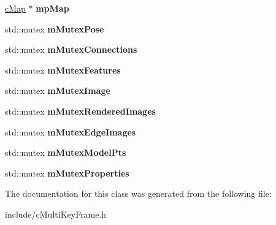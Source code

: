 \begin{DoxyCompactItemize}
\item 
\hyperlink{classMultiColSLAM_1_1cMap}{c\+Map} $\ast$ {\bfseries mp\+Map}\hypertarget{classMultiColSLAM_1_1cMultiKeyFrame_a2f9eeb3c126b9d3414ebaa3fe2f2aaf6}{}\label{classMultiColSLAM_1_1cMultiKeyFrame_a2f9eeb3c126b9d3414ebaa3fe2f2aaf6}

\item 
std\+::mutex {\bfseries m\+Mutex\+Pose}\hypertarget{classMultiColSLAM_1_1cMultiKeyFrame_ab1a3d1018970918898ae1723ce8df974}{}\label{classMultiColSLAM_1_1cMultiKeyFrame_ab1a3d1018970918898ae1723ce8df974}

\item 
std\+::mutex {\bfseries m\+Mutex\+Connections}\hypertarget{classMultiColSLAM_1_1cMultiKeyFrame_a738f6d55547b533c3b55d03998306347}{}\label{classMultiColSLAM_1_1cMultiKeyFrame_a738f6d55547b533c3b55d03998306347}

\item 
std\+::mutex {\bfseries m\+Mutex\+Features}\hypertarget{classMultiColSLAM_1_1cMultiKeyFrame_a5c53a53ee7c2ba8ed7365072de496556}{}\label{classMultiColSLAM_1_1cMultiKeyFrame_a5c53a53ee7c2ba8ed7365072de496556}

\item 
std\+::mutex {\bfseries m\+Mutex\+Image}\hypertarget{classMultiColSLAM_1_1cMultiKeyFrame_aafc2dcb33cbe43e26c021580162a85be}{}\label{classMultiColSLAM_1_1cMultiKeyFrame_aafc2dcb33cbe43e26c021580162a85be}

\item 
std\+::mutex {\bfseries m\+Mutex\+Rendered\+Images}\hypertarget{classMultiColSLAM_1_1cMultiKeyFrame_af33a3d8e4e0bd99d7627eabf93643e63}{}\label{classMultiColSLAM_1_1cMultiKeyFrame_af33a3d8e4e0bd99d7627eabf93643e63}

\item 
std\+::mutex {\bfseries m\+Mutex\+Edge\+Images}\hypertarget{classMultiColSLAM_1_1cMultiKeyFrame_aa17b8e6b45158a55e176e8174369b685}{}\label{classMultiColSLAM_1_1cMultiKeyFrame_aa17b8e6b45158a55e176e8174369b685}

\item 
std\+::mutex {\bfseries m\+Mutex\+Model\+Pts}\hypertarget{classMultiColSLAM_1_1cMultiKeyFrame_a4e5e7f6858d2595ebd22c72f991df9a5}{}\label{classMultiColSLAM_1_1cMultiKeyFrame_a4e5e7f6858d2595ebd22c72f991df9a5}

\item 
std\+::mutex {\bfseries m\+Mutex\+Properties}\hypertarget{classMultiColSLAM_1_1cMultiKeyFrame_ab6d17a0ccd3fb8076b9194cbb6ddf382}{}\label{classMultiColSLAM_1_1cMultiKeyFrame_ab6d17a0ccd3fb8076b9194cbb6ddf382}

\end{DoxyCompactItemize}


The documentation for this class was generated from the following file\+:\begin{DoxyCompactItemize}
\item 
include/c\+Multi\+Key\+Frame.\+h\end{DoxyCompactItemize}
